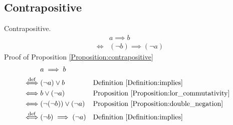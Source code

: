 \subsection{Contrapositive}
\begin{prop}
\label{Proposition:contrapositive}
Contrapositive.
\begin{align*}
& a \implies b \\
\iff & (\lnot b) \implies (\lnot a)
\end{align*}
Proof of Proposition \ref{Proposition:contrapositive}
\begin{align*}
& a \implies b \\
\overset{\operatorname{def}}{\iff} & (\lnot a) \lor b
& & \text{Definition \ref{Definition:implies}} \\
\iff & b \lor (\lnot a)
& & \text{Proposition \ref{Proposition:lor_commutativity}} \\
\iff & (\lnot (\lnot b)) \lor (\lnot a)
& & \text{Proposition \ref{Proposition:double_negation}} \\
\overset{\operatorname{def}}{\iff} & (\lnot b) \implies (\lnot a)
& & \text{Definition \ref{Definition:implies}} \\
\end{align*}
\end{prop}

